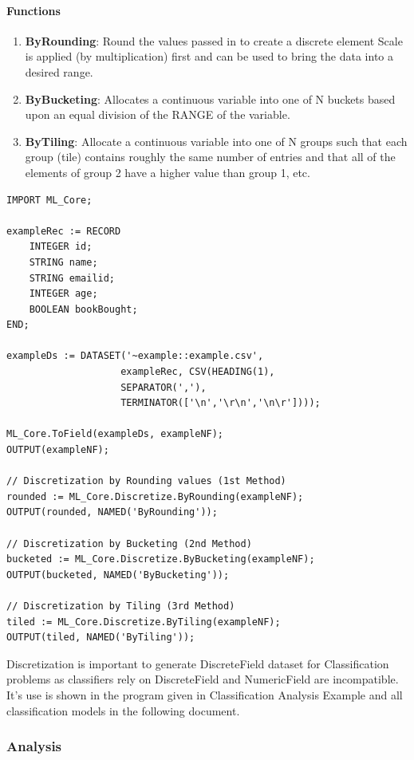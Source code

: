 \documentclass[a4paper,oneside,12pt]{book}
\begin{document}
\paragraph{Functions}

\begin{enumerate}
    \item \textbf{ByRounding}: Round the values passed in to create a discrete element Scale is applied (by multiplication) first and can be used to bring the data into a desired range.
    \item \textbf{ByBucketing}: Allocates a continuous variable into one of N buckets based upon an equal division of the RANGE of the variable.
    \item \textbf{ByTiling}: Allocate a continuous variable into one of N groups such that each group (tile) contains roughly the same number of entries and that all of the elements of group 2 have a higher value than group 1, etc.
\end{enumerate}

\begin{lstlisting}
IMPORT ML_Core;

exampleRec := RECORD
    INTEGER id;
    STRING name;
    STRING emailid;
    INTEGER age;
    BOOLEAN bookBought;
END;

exampleDs := DATASET('~example::example.csv', 
                    exampleRec, CSV(HEADING(1),
                    SEPARATOR(','),
                    TERMINATOR(['\n','\r\n','\n\r'])));

ML_Core.ToField(exampleDs, exampleNF);
OUTPUT(exampleNF);

// Discretization by Rounding values (1st Method)
rounded := ML_Core.Discretize.ByRounding(exampleNF);
OUTPUT(rounded, NAMED('ByRounding'));

// Discretization by Bucketing (2nd Method)
bucketed := ML_Core.Discretize.ByBucketing(exampleNF);
OUTPUT(bucketed, NAMED('ByBucketing'));

// Discretization by Tiling (3rd Method)
tiled := ML_Core.Discretize.ByTiling(exampleNF);
OUTPUT(tiled, NAMED('ByTiling'));
\end{lstlisting}

Discretization is important to generate DiscreteField dataset for Classification problems as classifiers rely on DiscreteField and NumericField are incompatible. It's use is shown in the program given in Classification Analysis Example and all classification models in the following document.

\subsubsection{Analysis}\label{mlcore:analysis}
\end{document}
